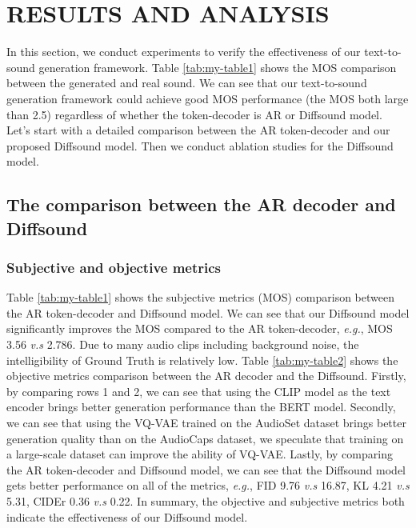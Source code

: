 \documentclass[lettersize,journal]{IEEEtran}
\begin{document}
\section{RESULTS AND ANALYSIS}
In this section, we conduct experiments to verify the effectiveness of our text-to-sound generation framework. Table \ref{tab:my-table1} shows the MOS comparison between the generated and real sound. {\color{black}We can see that our text-to-sound generation framework could achieve good MOS performance (the MOS both large than 2.5) regardless of whether the token-decoder is AR or Diffsound model.} Let's start with a detailed comparison between the AR token-decoder and our proposed Diffsound model. Then we conduct ablation studies for the Diffsound model. 
\subsection{The comparison between the AR decoder and Diffsound}
\subsubsection{Subjective and objective metrics}
Table \ref{tab:my-table1} shows the subjective metrics (MOS) comparison between the AR token-decoder and Diffsound model. We can see that our Diffsound model significantly improves the MOS compared to the AR token-decoder, \textit{e.g.}, MOS 3.56 \textit{v.s} 2.786. Due to many audio clips including background noise, the intelligibility of Ground Truth is relatively low.
Table \ref{tab:my-table2} shows the objective metrics comparison between the AR decoder and the Diffsound. Firstly, by comparing rows 1 and 2, we can see that using the CLIP model as the text encoder brings better generation performance than the BERT model. Secondly, we can see that using the VQ-VAE trained on the AudioSet dataset brings better generation quality than on the AudioCaps dataset, we speculate that training on a large-scale dataset can improve the ability of VQ-VAE.
Lastly, by comparing the AR token-decoder and Diffsound model, we can see that the Diffsound model gets better performance on all of the metrics, \textit{e.g.}, FID 9.76  \textit{v.s} 16.87, KL 4.21 \textit{v.s} 5.31, CIDEr 0.36 \textit{v.s} 0.22. In summary, the objective and subjective metrics both indicate the effectiveness of our Diffsound model.
\end{document}
